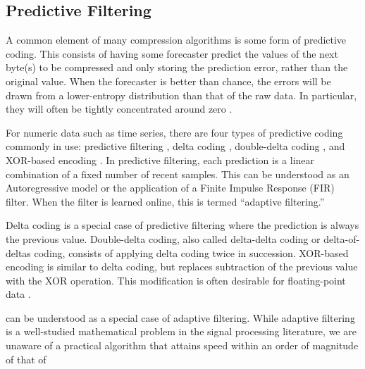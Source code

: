 
\subsection{Predictive Filtering}


A common element of many compression algorithms is some form of predictive coding. This consists of having some forecaster predict the values of the next byte(s) to be compressed and only storing the prediction error, rather than the original value. When the forecaster is better than chance, the errors will be drawn from a lower-entropy distribution than that of the raw data. In particular, they will often be tightly concentrated around zero \cite{shorten}.

For numeric data such as time series, there are four types of predictive coding commonly in use: predictive filtering \cite{png}, delta coding \cite{fastpfor, bbp}, double-delta coding \cite{influxDB, gorilla}, and XOR-based encoding \cite{gorilla}. In predictive filtering, each prediction is a linear combination of a fixed number of recent samples. This can be understood as an Autoregressive model or the application of a Finite Impulse Response (FIR) filter. When the filter is learned online, this is termed ``adaptive filtering.''

Delta coding is a special case of predictive filtering where the prediction is always the previous value. Double-delta coding, also called delta-delta coding or delta-of-deltas coding, consists of applying delta coding twice in succession. XOR-based encoding is similar to delta coding, but replaces subtraction of the previous value with the XOR operation. This modification is often desirable for floating-point data \cite{gorilla}.

\fire can be understood as a special case of adaptive filtering. While adaptive filtering is a well-studied mathematical problem in the signal processing literature, we are unaware of a practical algorithm that attains speed within an order of magnitude of that of \fire%




